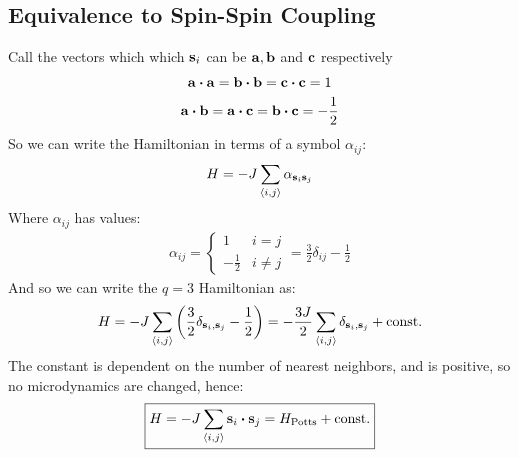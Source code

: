 \subsection{Equivalence to Spin-Spin Coupling}
Call the vectors which which $\vb{s}_i$ can be $\vb{a},\vb{b}$ and $\vb{c}$ respectively
\begin{gather*}
  \vb{a\vdot a}=\vb{b\vdot b}=\vb{c\vdot c}=1\\
  \vb{a\vdot b}=\vb{a\vdot c}=\vb{b\vdot c}=-\frac12
\end{gather*}
So we can write the Hamiltonian in terms of a symbol $\alpha_{ij}$:
\begin{align*}
  H=-J\sum_{\ev{i,j}}\alpha_{\vb{s}_i\vb{s}_j}
\end{align*}
Where $\alpha_{ij}$ has values:
\begin{align*}
  \alpha_{ij}=
  \begin{cases}
    1 & i=j \\
    -\frac12 & i\neq j
  \end{cases}
  =\frac32\delta_{ij}-\frac12
\end{align*}
And so we can write the $q=3$ Hamiltonian as:
\begin{align*}
  H=-J\sum_{\ev{i,j}}\qty(\frac32\delta_{\vb{s}_i,\vb{s}_j}-\frac12)
  =-\frac{3J}2\sum_{\ev{i,j}}\delta_{\vb{s}_i,\vb{s}_j}+\text{const.}
\end{align*}
The constant is dependent on the number of nearest neighbors, and is positive, so no microdynamics are changed, hence:
\begin{equation}
  \boxed{H=-J\sum_{\ev{i,j}}\vb{s}_i\vdot\vb{s}_j
    = H_{\text{Potts}}+\text{const.}}
\end{equation}


